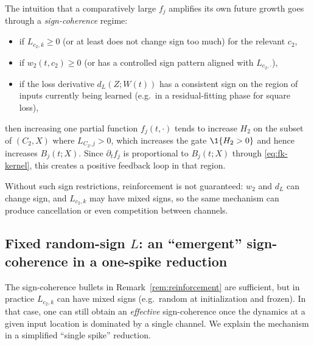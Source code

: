 \begin{remark}\label{rem:reinforcement}
The intuition that a comparatively large $f_j$ amplifies its own future growth goes through a \emph{sign-coherence} regime:
\begin{itemize}
\item if $L_{c_2,k}\ge 0$ (or at least does not change sign too much) for the relevant $c_2$,
\item if $w_2(t,c_2)\ge 0$ (or has a controlled sign pattern aligned with $L_{c_2,\cdot}$),
\item if the loss derivative $d_L(Z;W(t))$ has a consistent sign on the region of inputs currently being learned (e.g.\ in a residual-fitting phase for square loss),
\end{itemize}
then increasing one partial function $f_j(t,\cdot)$ tends to increase $H_2$ on the subset of $(C_2,X)$ where $L_{C_2,j}>0$, which increases the gate $\1\{H_2>0\}$ and hence increases $B_j(t;X)$.
Since $\partial_t f_j$ is proportional to $B_j(t;X)$ through \eqref{eq:fk-kernel}, this creates a positive feedback loop in that region.

Without such sign restrictions, reinforcement is not guaranteed: $w_2$ and $d_L$ can change sign, and $L_{c_2,k}$ may have mixed signs, so the same mechanism can produce cancellation or even competition between channels.
\end{remark}

\subsection{Fixed random-sign $L$: an ``emergent'' sign-coherence in a one-spike reduction}\label{subsec:randomL-emergent}

The sign-coherence bullets in Remark~\ref{rem:reinforcement} are sufficient, but in practice $L_{c_2,k}$ can have mixed signs (e.g.\ random at initialization and frozen).
In that case, one can still obtain an \emph{effective} sign-coherence once the dynamics at a given input location is dominated by a single channel.
We explain the mechanism in a simplified ``single spike'' reduction.

